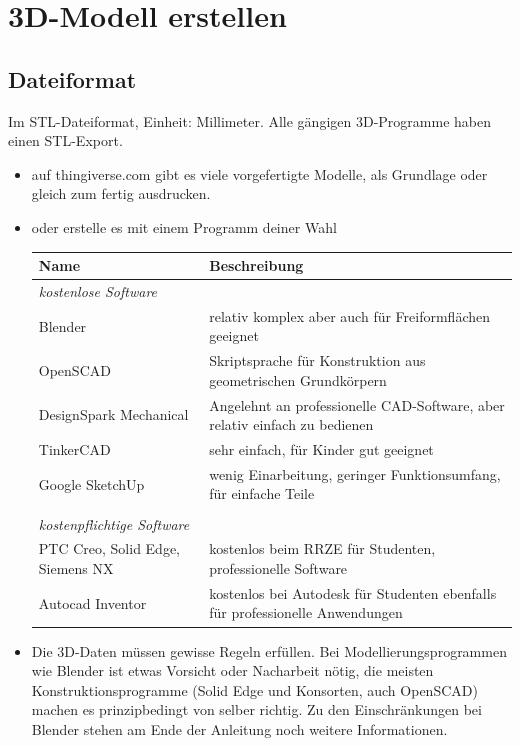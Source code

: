 \documentclass{\basedir/fablab-document}
\begin{document}
\newpage

\section{3D-Modell erstellen}
\subsection{Dateiformat}

Im STL-Dateiformat, Einheit: Millimeter. Alle gängigen 3D-Programme haben einen STL-Export.

\begin{itemize}
\item auf thingiverse.com gibt es viele vorgefertigte Modelle, als
Grundlage oder gleich zum fertig ausdrucken.
\item oder erstelle es mit einem Programm deiner Wahl
\begin{table}[H]
\centering
\begin{tabularx}{\textwidth}{|l|X|}
\hline \textbf{Name} & \textbf{Beschreibung} \\
\hline \textit{kostenlose Software} &  \\ 
\hline Blender & relativ komplex aber auch für Freiformflächen geeignet  \\ 
\hline OpenSCAD & Skriptsprache für Konstruktion aus geometrischen Grundkörpern \\ 
\hline DesignSpark Mechanical & Angelehnt an professionelle CAD-Software, aber relativ einfach zu bedienen  \\ 
\hline TinkerCAD & sehr einfach, für Kinder gut geeignet  \\ 
\hline Google SketchUp & wenig Einarbeitung, geringer Funktionsumfang, für einfache Teile \\
\hline & \\
\hline \textit{kostenpflichtige Software} & \\
\hline PTC Creo, Solid Edge, Siemens NX & kostenlos beim RRZE für Studenten, professionelle Software \\
\hline Autocad Inventor & kostenlos bei Autodesk für Studenten ebenfalls für professionelle Anwendungen \\
\hline 
\end{tabularx} 
\end{table}
\item Die 3D-Daten müssen gewisse Regeln erfüllen. Bei Modellierungsprogrammen wie Blender ist etwas Vorsicht oder Nacharbeit nötig, die meisten Konstruktionsprogramme (Solid Edge und Konsorten, auch OpenSCAD) machen es prinzipbedingt von selber richtig. Zu den Einschränkungen bei Blender stehen am Ende der Anleitung noch weitere Informationen.
\end{itemize}
\end{document}
